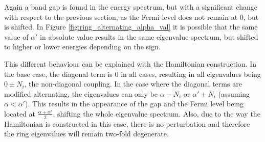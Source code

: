\documentclass{article}
\begin{document}
Again a band gap is found in the energy spectrum, but with a significant change with respect to the previous section, as the Fermi level does not remain at $0$, but is shifted. In Figure \ref{fig:ring_alternating_alpha_val} it is possible that the same value of $\alpha'$ in absolute value results in the same eigenvalue spectrum, but shifted to higher or lower energies depending on the sign. 

This different behaviour can be explained with the Hamiltonian construction. In the base case, the diagonal term is $0$ in all cases, resulting in all eigenvalues being $0 \pm N_i$, the non-diagonal coupling. In the case where the diagonal terms are modified alternating, the eigenvalues can only be  $\alpha-N_i$ or $\alpha'+N_i$ (assuming $\alpha < \alpha'$). This results in the appearance of the gap and the Fermi level being located at $\frac{\alpha + \alpha'}{2}$, shifting the whole eigenvalue spectrum. Also, due to the way the Hamiltonian is constructed in this case, there is no perturbation and therefore the ring eigenvalues will remain two-fold degenerate. 
\end{document}
